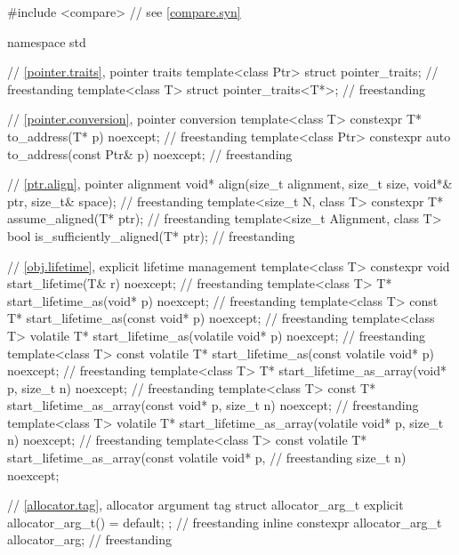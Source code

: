 \begin{codeblock}
#include <compare>              // see \ref{compare.syn}

namespace std {
  // \ref{pointer.traits}, pointer traits
  template<class Ptr> struct pointer_traits;                                        // freestanding
  template<class T> struct pointer_traits<T*>;                                      // freestanding

  // \ref{pointer.conversion}, pointer conversion
  template<class T>
    constexpr T* to_address(T* p) noexcept;                                         // freestanding
  template<class Ptr>
    constexpr auto to_address(const Ptr& p) noexcept;                               // freestanding

  // \ref{ptr.align}, pointer alignment
  void* align(size_t alignment, size_t size, void*& ptr, size_t& space);            // freestanding
  template<size_t N, class T>
    constexpr T* assume_aligned(T* ptr);                                            // freestanding
  template<size_t Alignment, class T>
    bool is_sufficiently_aligned(T* ptr);                                           // freestanding

  // \ref{obj.lifetime}, explicit lifetime management
  template<class T>
    constexpr void start_lifetime(T& r) noexcept;                                   // freestanding
  template<class T>
    T* start_lifetime_as(void* p) noexcept;                                         // freestanding
  template<class T>
    const T* start_lifetime_as(const void* p) noexcept;                             // freestanding
  template<class T>
    volatile T* start_lifetime_as(volatile void* p) noexcept;                       // freestanding
  template<class T>
    const volatile T* start_lifetime_as(const volatile void* p) noexcept;           // freestanding
  template<class T>
    T* start_lifetime_as_array(void* p, size_t n) noexcept;                         // freestanding
  template<class T>
    const T* start_lifetime_as_array(const void* p, size_t n) noexcept;             // freestanding
  template<class T>
    volatile T* start_lifetime_as_array(volatile void* p, size_t n) noexcept;       // freestanding
  template<class T>
    const volatile T* start_lifetime_as_array(const volatile void* p,               // freestanding
                                              size_t n) noexcept;

  // \ref{allocator.tag}, allocator argument tag
  struct allocator_arg_t { explicit allocator_arg_t() = default; };                 // freestanding
  inline constexpr allocator_arg_t allocator_arg{};                                 // freestanding

}
\end{codeblock}
